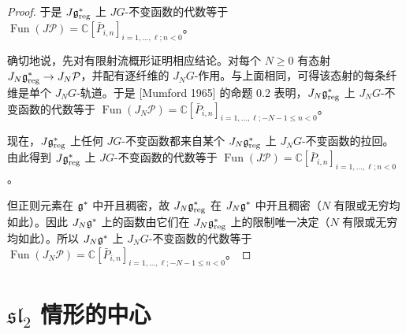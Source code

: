 \begin{proof}
    于是 $J\mathfrak{g}^*_{\mathrm{reg}}$ 上 $JG$-不变函数的代数等于 $\operatorname{Fun}(J\mathcal{P})=\mathbb{C}[\bar P_{i,n}]_{i=1,\dots,\ell;n<0}$。

    确切地说，先对有限射流概形证明相应结论。对每个 $N\ge 0$ 有态射 $J_N\mathfrak{g}^*_{\mathrm{reg}}\to J_N\mathcal{P}$，并配有逐纤维的 $J_NG$-作用。与上面相同，可得该态射的每条纤维是单个 $J_NG$-轨道。于是 [Mumford 1965] 的命题 0.2 表明，$J_N\mathfrak{g}^*_{\mathrm{reg}}$ 上 $J_NG$-不变函数的代数等于 $\operatorname{Fun}(J_N\mathcal{P})=\mathbb{C}[\bar P_{i,n}]_{i=1,\dots,\ell;-N-1\le n<0}$。

    现在，$J\mathfrak{g}^*_{\mathrm{reg}}$ 上任何 $JG$-不变函数都来自某个 $J_N\mathfrak{g}^*_{\mathrm{reg}}$ 上 $J_NG$-不变函数的拉回。由此得到 $J\mathfrak{g}^*_{\mathrm{reg}}$ 上 $JG$-不变函数的代数等于 $\operatorname{Fun}(J\mathcal{P})=\mathbb{C}[\bar P_{i,n}]_{i=1,\dots,\ell;n<0}$。

    但正则元素在 $\mathfrak{g}^*$ 中开且稠密，故 $J_N\mathfrak{g}^*_{\mathrm{reg}}$ 在 $J_N\mathfrak{g}^*$ 中开且稠密（$N$ 有限或无穷均如此）。因此 $J_N\mathfrak{g}^*$ 上的函数由它们在 $J_N\mathfrak{g}^*_{\mathrm{reg}}$ 上的限制唯一决定（$N$ 有限或无穷均如此）。所以 $J_N\mathfrak{g}^*$ 上 $J_NG$-不变函数的代数等于 $\operatorname{Fun}(J_N\mathcal{P})=\mathbb{C}[\bar P_{i,n}]_{i=1,\dots,\ell;-N-1\le n<0}$。
\end{proof}


\section{$\mathfrak{sl}_2$ 情形的中心}


